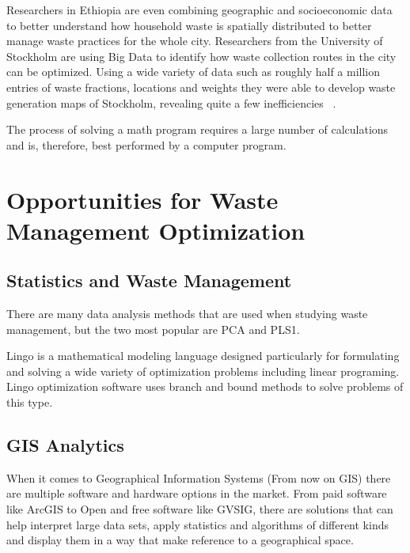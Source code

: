 \documentclass[sigconf]{acmart}
\begin{document}
Researchers in Ethiopia are even combining geographic and socioeconomic data to better understand how household waste is spatially distributed to better manage waste practices for the whole city. Researchers from the University of Stockholm are using Big Data to identify how waste collection routes in the city can be optimized. Using a wide variety of data such as roughly half a million entries of waste fractions, locations and weights they were able to develop waste generation maps of Stockholm, revealing quite a few inefficiencies ~\cite{markvan2016}.




The process of solving a math program requires a large number of calculations and is, therefore, best performed by a computer program. ~\cite{akbarpour2016}


\section{Opportunities for Waste Management Optimization}





\subsection{Statistics and Waste Management}

There are many data analysis methods that are used when studying waste management, but the two most popular are PCA and PLS1. 
~\cite{bohm2013}

Lingo is a mathematical modeling language designed particularly for formulating and solving a wide variety of optimization problems including linear programing. Lingo optimization software uses branch and bound methods to solve problems of this type. ~\cite{akbarpour2016}

\subsection{GIS Analytics}

When it comes to Geographical Information Systems (From now on GIS) there are multiple software and hardware options in the market. From paid software like ArcGIS to Open and free software like GVSIG, there are solutions that can help interpret large data sets, apply statistics and algorithms of different kinds and display them in a way that make reference to a geographical space. %
\end{document}
